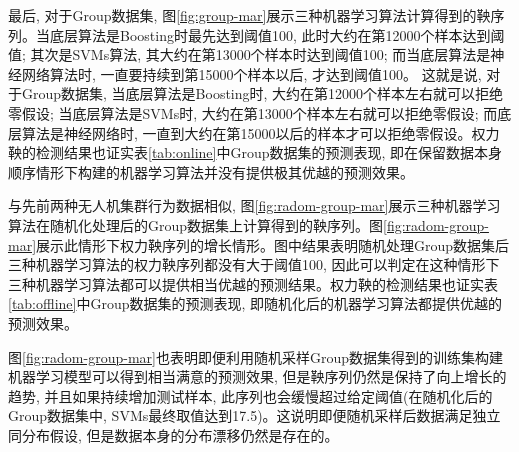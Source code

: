 最后, 对于Group数据集, 图\ref{fig:group-mar}展示三种机器学习算法计算得到的鞅序列。当底层算法是Boosting时最先达到阈值100, 此时大约在第12000个样本达到阈值; 其次是SVMs算法, 其大约在第13000个样本时达到阈值100; 而当底层算法是神经网络算法时, 一直要持续到第15000个样本以后, 才达到阈值100。 这就是说, 对于Group数据集, 当底层算法是Boosting时, 大约在第12000个样本左右就可以拒绝零假设; 当底层算法是SVMs时, 大约在第13000个样本左右就可以拒绝零假设; 而底层算法是神经网络时, 一直到大约在第15000以后的样本才可以拒绝零假设。权力鞅的检测结果也证实表\ref{tab:online}中Group数据集的预测表现, 即在保留数据本身顺序情形下构建的机器学习算法并没有提供极其优越的预测效果。

与先前两种无人机集群行为数据相似, 图\ref{fig:radom-group-mar}展示三种机器学习算法在随机化处理后的Group数据集上计算得到的鞅序列。图\ref{fig:radom-group-mar}展示此情形下权力鞅序列的增长情形。图中结果表明随机处理Group数据集后三种机器学习算法的权力鞅序列都没有大于阈值100, 因此可以判定在这种情形下三种机器学习算法都可以提供相当优越的预测结果。权力鞅的检测结果也证实表\ref{tab:offline}中Group数据集的预测表现, 即随机化后的机器学习算法都提供优越的预测效果。

图\ref{fig:radom-group-mar}也表明即便利用随机采样Group数据集得到的训练集构建机器学习模型可以得到相当满意的预测效果, 但是鞅序列仍然是保持了向上增长的趋势, 并且如果持续增加测试样本, 此序列也会缓慢超过给定阈值(在随机化后的Group数据集中, SVMs最终取值达到17.5)。这说明即便随机采样后数据满足独立同分布假设, 但是数据本身的分布漂移仍然是存在的。

